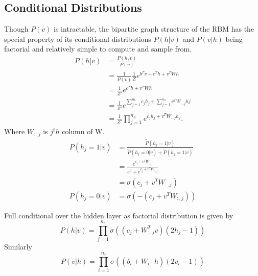 \documentclass[letterpaper,10pt,english]{article}
\begin{document}
\subsection{Conditional Distributions}
Though $P(v)$ is intractable, the bipartite graph structure of the RBM has the
special property of its conditional distributions $P(h|v)$ and $P(v|h)$ being
factorial and relatively simple to compute and sample from.
\begin{align}
P(h|v)&=\frac{P(h,v)}{P(v)}\\
&=\frac{1}{P(v)}\frac{1}{Z}e^{b^Tv+c^Th+v^TWh}\\&=\frac{1}{Z'}e^{c^Th+v^TWh}\\
&=\frac{1}{Z'}e^{\sum_{j=1}^{n_h} c_jh_j+\sum_{j=1}^{n_h} v^TW_{:,j}hj}\\
&=\frac{1}{Z'}\prod_{j=1}^{n_h}e^{c_jh_j+v^TW_{:,j}h_j}.
\end{align}
Where $W_{:,j}$ is $j^th$ column of W.
\begin{align}
P(h_j=1|v)&=\frac{\widetilde{P}(h_j=1|v)}{\widetilde{P}(h_j=0|v)+\widetilde{P}(h_j=1|v)}\\
&=\frac{e^{c_j+v^TW_{:,j}}}{e^0+e^{c_j+v^TW_{:,j}}}\\
&=\sigma(c_j+v^TW_{:,j})\\
P(h_j=0|v)&=\sigma(-(c_j+v^TW_{:,j}))
\end{align}

Full conditional over the hidden layer as factorial distribution is given by
$$P(h|v)=\prod_{j=1}^{n_h}\sigma((c_j+W_{:,j}^Tv)(2h_j-1))$$
Similarly $$P(v|h)=\prod_{i=1}^{n_v}\sigma((b_i+W_{i,:}h)(2v_i-1))$$
\end{document}
